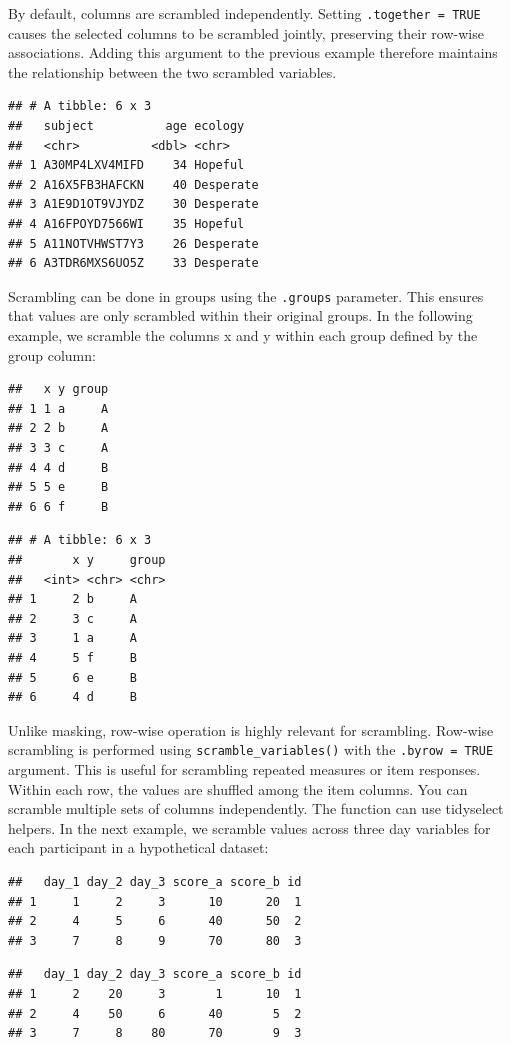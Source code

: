 \documentclass[
  english,
  man,floatsintext]{apa6}
\begin{document}
By default, columns are scrambled independently. Setting \texttt{.together\ =\ TRUE} causes the selected columns to be scrambled jointly, preserving their row-wise associations. Adding this argument to the previous example therefore maintains the relationship between the two scrambled variables.

\begin{verbatim}
## # A tibble: 6 x 3
##   subject          age ecology  
##   <chr>          <dbl> <chr>    
## 1 A30MP4LXV4MIFD    34 Hopeful  
## 2 A16X5FB3HAFCKN    40 Desperate
## 3 A1E9D1OT9VJYDZ    30 Desperate
## 4 A16FPOYD7566WI    35 Hopeful  
## 5 A11NOTVHWST7Y3    26 Desperate
## 6 A3TDR6MXS6UO5Z    33 Desperate
\end{verbatim}

Scrambling can be done in groups using the \texttt{.groups} parameter. This ensures that values are only scrambled within their original groups. In the following example, we scramble the columns x and y within each group defined by the group column:

\begin{verbatim}
##   x y group
## 1 1 a     A
## 2 2 b     A
## 3 3 c     A
## 4 4 d     B
## 5 5 e     B
## 6 6 f     B
\end{verbatim}

\begin{verbatim}
## # A tibble: 6 x 3
##       x y     group
##   <int> <chr> <chr>
## 1     2 b     A    
## 2     3 c     A    
## 3     1 a     A    
## 4     5 f     B    
## 5     6 e     B    
## 6     4 d     B
\end{verbatim}

Unlike masking, row-wise operation is highly relevant for scrambling. Row-wise scrambling is performed using \texttt{scramble\_variables()} with the \texttt{.byrow\ =\ TRUE} argument. This is useful for scrambling repeated measures or item responses. Within each row, the values are shuffled among the item columns. You can scramble multiple sets of columns independently. The function can use tidyselect helpers. In the next example, we scramble values across three day variables for each participant in a hypothetical dataset:

\begin{verbatim}
##   day_1 day_2 day_3 score_a score_b id
## 1     1     2     3      10      20  1
## 2     4     5     6      40      50  2
## 3     7     8     9      70      80  3
\end{verbatim}

\begin{verbatim}
##   day_1 day_2 day_3 score_a score_b id
## 1     2    20     3       1      10  1
## 2     4    50     6      40       5  2
## 3     7     8    80      70       9  3
\end{verbatim}
\end{document}
